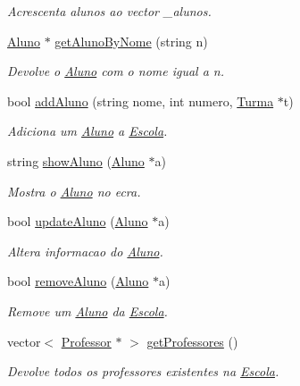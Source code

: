 \begin{DoxyCompactItemize}
\begin{DoxyCompactList}\small\item\em Acrescenta alunos ao vector \-\_\-alunos. \end{DoxyCompactList}\item 
\hyperlink{class_aluno}{Aluno} $\ast$ \hyperlink{class_escola_a7582a678219ca0977bab1ac1db1109f2}{get\-Aluno\-By\-Nome} (string n)
\begin{DoxyCompactList}\small\item\em Devolve o \hyperlink{class_aluno}{Aluno} com o nome igual a n. \end{DoxyCompactList}\item 
bool \hyperlink{class_escola_ab8911a8daa03ac6172defbcb68710b06}{add\-Aluno} (string nome, int numero, \hyperlink{class_turma}{Turma} $\ast$t)
\begin{DoxyCompactList}\small\item\em Adiciona um \hyperlink{class_aluno}{Aluno} a \hyperlink{class_escola}{Escola}. \end{DoxyCompactList}\item 
string \hyperlink{class_escola_a61476572624adfbc5ff2a0dce1e8ce0b}{show\-Aluno} (\hyperlink{class_aluno}{Aluno} $\ast$a)
\begin{DoxyCompactList}\small\item\em Mostra o \hyperlink{class_aluno}{Aluno} no ecra. \end{DoxyCompactList}\item 
bool \hyperlink{class_escola_ab8ae7317b753dbe8308a60ac39d4f714}{update\-Aluno} (\hyperlink{class_aluno}{Aluno} $\ast$a)
\begin{DoxyCompactList}\small\item\em Altera informacao do \hyperlink{class_aluno}{Aluno}. \end{DoxyCompactList}\item 
bool \hyperlink{class_escola_acfa55addf5866a486acdfdc84ee9c66a}{remove\-Aluno} (\hyperlink{class_aluno}{Aluno} $\ast$a)
\begin{DoxyCompactList}\small\item\em Remove um \hyperlink{class_aluno}{Aluno} da \hyperlink{class_escola}{Escola}. \end{DoxyCompactList}\item 
vector$<$ \hyperlink{class_professor}{Professor} $\ast$ $>$ \hyperlink{class_escola_a8cdb86f03082f15f5f3ce63d1ae0b1f2}{get\-Professores} ()
\begin{DoxyCompactList}\small\item\em Devolve todos os professores existentes na \hyperlink{class_escola}{Escola}. \end{DoxyCompactList}\item 

\end{DoxyCompactItemize}
